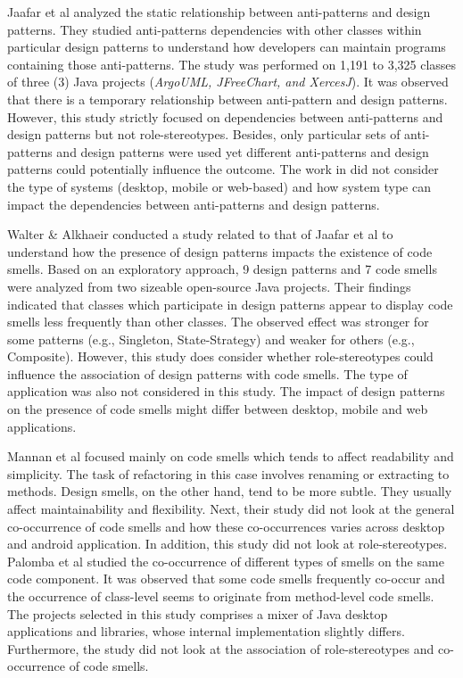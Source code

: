 \documentclass[AMA,Times1COL]{WileyNJDv5} %
\begin{document}
Jaafar et al \cite{jaafar2014analysing} analyzed the static relationship between anti-patterns and design patterns. They studied anti-patterns dependencies with other classes within particular design patterns to understand how developers can maintain programs containing those anti-patterns. The study was performed on 1,191 to 3,325 classes of three (3) Java projects (\textit{ArgoUML, JFreeChart, and XercesJ}). It was observed that there is a temporary relationship between anti-pattern and design patterns. However, this study strictly focused on dependencies between anti-patterns and design patterns but not role-stereotypes. Besides, only particular sets of anti-patterns and design patterns were used yet different anti-patterns and design patterns could potentially influence the outcome. The work in \cite{jaafar2014analysing} did not consider the type of systems (desktop, mobile or web-based) and how system type can impact the dependencies between anti-patterns and design patterns.

Walter \& Alkhaeir \cite{walter2016relationship} conducted a study related to that of Jaafar et al \cite{jaafar2014analysing} to understand how the presence of design patterns impacts the existence of code smells. Based on an exploratory approach, 9 design patterns and 7 code smells were analyzed from two sizeable open-source Java projects. Their findings indicated that classes which participate in design patterns appear to display code smells less frequently than other classes. The observed effect was stronger for some patterns (e.g., Singleton, State-Strategy) and weaker for others (e.g., Composite). However, this study does consider whether role-stereotypes could influence the association of design patterns with code smells. The type of application was also not considered in this study. The impact of design patterns on the presence of code smells might differ between desktop, mobile and web applications.

Mannan et al\cite{mannan2016understanding} focused mainly on code smells which tends to affect readability and simplicity. The task of refactoring in this case involves renaming or extracting to methods. Design smells, on the other hand, tend to be more subtle. They usually affect maintainability and flexibility. Next, their study \cite{mannan2016understanding} did not look at the general co-occurrence of code smells and how these co-occurrences varies across desktop and android application. In addition, this study did not look at role-stereotypes. Palomba et al \cite{palomba2017investigating} studied the co-occurrence of different types of smells on the same code component. It was observed that some code smells frequently co-occur and the occurrence of class-level seems to originate from method-level code smells. The projects selected in this study comprises a mixer of Java desktop applications and libraries, whose internal implementation slightly differs. Furthermore, the study did not look at the association of role-stereotypes and co-occurrence of code smells.
\end{document}
